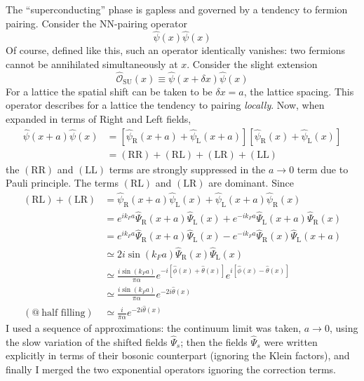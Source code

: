 The ``superconducting'' phase is gapless and governed by a tendency to fermion pairing. Consider the NN-pairing operator
\[
	\hat \psi(x) \hat \psi(x)
\]
Of course, defined like this, such an operator identically vanishes: two fermions cannot be annihilated simultaneously at $x$. Consider the slight extension
\[
	\hat{\mathcal{O}}_\mathrm{SU}(x) \equiv \hat \psi (x+\delta x) \hat \psi (x)
\]
For a lattice the spatial shift can be taken to be $\delta x = a$, the lattice spacing. This operator describes for a lattice the tendency to pairing \textit{locally}. Now, when expanded in terms of Right and Left fields,
\[
	\begin{aligned}
		\hat \psi (x+a) \hat \psi(x) &= \left[
			\hat \psi_\mathrm{R} (x+a) +
			\hat \psi_\mathrm{L} (x+a)
		\right] \left[
			\hat \psi_\mathrm{R} (x) +
			\hat \psi_\mathrm{L} (x)
		\right] \\
		&= (\mathrm{RR}) + (\mathrm{RL}) + (\mathrm{LR}) + (\mathrm{LL})
	\end{aligned}
\]
the $(\mathrm{RR})$ and $(\mathrm{LL})$ terms are strongly suppressed in the $a \to 0$ term due to Pauli principle. The terms $(\mathrm{RL})$ and $(\mathrm{LR})$ are dominant. Since
\[
	\begin{aligned}
		(\mathrm{RL}) + (\mathrm{LR}) &= \hat \psi_\mathrm{R} (x+a) \hat \psi_\mathrm{L} (x) + \hat \psi_\mathrm{L} (x+a) \hat \psi_\mathrm{R} (x) \\
		&= e^{ik_F a} \hat \Psi_\mathrm{R} (x+a) \hat \Psi_\mathrm{L} (x) + e^{-ik_F a} \hat \Psi_\mathrm{L} (x+a) \hat \Psi_\mathrm{R} (x) \\
		&= e^{ik_F a} \hat \Psi_\mathrm{R} (x+a) \hat \Psi_\mathrm{L} (x) - e^{-ik_F a} \hat \Psi_\mathrm{R} (x) \hat \Psi_\mathrm{L} (x+a)\\
		&\simeq 2i \sin(k_F a) \hat \Psi_\mathrm{R} (x) \hat \Psi_\mathrm{L} (x) \\
		&\simeq \frac{i \sin(k_F a)}{\pi\alpha} e^{-i \left[ \hat \phi(x) + \hat \theta(x) \right] } e^{i \left[ \hat \phi(x) - \hat \theta(x) \right]} \\
		&\simeq \frac{i \sin(k_F a)}{\pi\alpha} e^{-2i\hat\theta(x)} \\
		(@ \ \text{half filling})&\simeq \frac{i}{\pi\alpha} e^{-2i\hat\theta(x)}
	\end{aligned}
\]
I used a sequence of approximations: the continuum limit was taken, $a \to 0$, using the slow variation of the shifted fields $\hat \Psi_s$; then the fields $\hat \Psi_s$ were written explicitly in terms of their bosonic counterpart (ignoring the Klein factors), and finally I merged the two exponential operators ignoring the correction terms.

